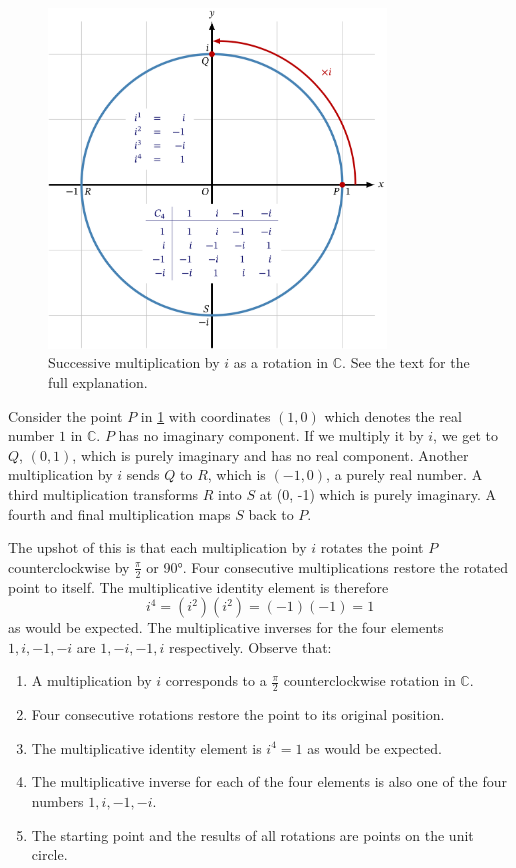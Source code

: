\documentclass[
  a4paper,
]{article}
\providecommand{\tightlist}{%
  \setlength{\itemsep}{0pt}\setlength{\parskip}{0pt}}
\begin{document}
\begin{figure}
\hypertarget{fig:C4}{%
\centering
\includegraphics[width=0.8\textwidth,height=\textheight]{images/C4.png}
\caption{Successive multiplication by \(i\) as a rotation in
\(\mathbb{C}\). See the text for the full explanation.}\label{fig:C4}
}
\end{figure}

Consider the point \(P\) in \cref{fig:C4} with coordinates \((1, 0)\)
which denotes the real number \(1\) in \(\mathbb{C}\). \(P\) has no
imaginary component. If we multiply it by \(i\), we get to \(Q\),
\((0, 1)\), which is purely imaginary and has no real component. Another
multiplication by \(i\) sends \(Q\) to \(R\), which is \((-1, 0)\), a
purely real number. A third multiplication transforms \(R\) into \(S\)
at (0, -1) which is purely imaginary. A fourth and final multiplication
maps \(S\) back to \(P\).

The upshot of this is that each multiplication by \(i\) rotates the
point \(P\) counterclockwise by \(\frac{\pi}{2}\) or 90°. Four
consecutive multiplications restore the rotated point to itself. The
multiplicative identity element is therefore \[
i^4 = (i^2)(i^2) = (-1)(-1) = 1
\] as would be expected. The multiplicative inverses for the four
elements \(1, i, -1, -i\) are \(1, -i, -1, i\) respectively. Observe
that:

\begin{enumerate}
\tightlist
\item
  A multiplication by \(i\) corresponds to a \(\frac{\pi}{2}\)
  counterclockwise rotation in \(\mathbb{C}\).
\item
  Four consecutive rotations restore the point to its original position.
\item
  The multiplicative identity element is \(i^4 = 1\) as would be
  expected.
\item
  The multiplicative inverse for each of the four elements is also one
  of the four numbers \(1, i, -1, -i\).
\item
  The starting point and the results of all rotations are points on the
  unit circle.
\end{enumerate}
\end{document}
